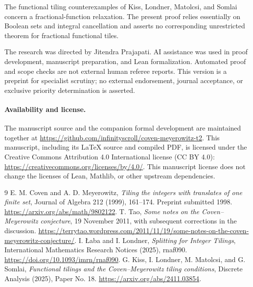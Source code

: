 \documentclass[11pt]{article}
\begin{document}
The functional tiling counterexamples of Kiss, Londner, Matolcsi, and Somlai~\cite{KLMS} concern a fractional-function relaxation. The present proof relies essentially on Boolean sets and integral cancellation and asserts no corresponding unrestricted theorem for fractional functional tiles.

The research was directed by Jitendra Prajapati. AI assistance was used in proof development, manuscript preparation, and Lean formalization. Automated proof and scope checks are not external human referee reports. This version is a preprint for specialist scrutiny; no external endorsement, journal acceptance, or exclusive priority determination is asserted.

\paragraph{Availability and license.}
The manuscript source and the companion formal development are maintained together at \url{https://github.com/infinityscroll/coven-meyerowitz-t2}. This manuscript, including its LaTeX source and compiled PDF, is licensed under the Creative Commons Attribution 4.0 International license (CC BY 4.0): \url{https://creativecommons.org/licenses/by/4.0/}. This manuscript license does not change the licenses of Lean, Mathlib, or other upstream dependencies.

\begin{thebibliography}{9}
 E. M. Coven and A. D. Meyerowitz, \emph{Tiling the integers with translates of one finite set}, Journal of Algebra 212 (1999), 161--174. Preprint submitted 1998. \url{https://arxiv.org/abs/math/9802122}.
 T. Tao, \emph{Some notes on the Coven--Meyerowitz conjecture}, 19 November 2011, with subsequent corrections in the discussion. \url{https://terrytao.wordpress.com/2011/11/19/some-notes-on-the-coven-meyerowitz-conjecture/}.
 I. \L aba and I. Londner, \emph{Splitting for Integer Tilings}, International Mathematics Research Notices (2025), rnaf090. \url{https://doi.org/10.1093/imrn/rnaf090}.
 G. Kiss, I. Londner, M. Matolcsi, and G. Somlai, \emph{Functional tilings and the Coven--Meyerowitz tiling conditions}, Discrete Analysis (2025), Paper No. 18. \url{https://arxiv.org/abs/2411.03854}.
\end{thebibliography}
\end{document}
